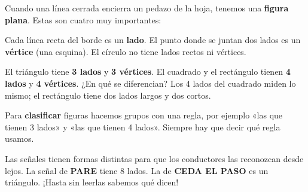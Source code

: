\documentclass[11pt]{article}
\begin{document}
Cuando una línea cerrada encierra un pedazo de la hoja, tenemos una
\textbf{figura plana}. Estas son cuatro muy importantes:

\begin{center}
\end{center}

Cada línea recta del borde es un \textbf{lado}. El punto donde se juntan dos
lados es un \textbf{vértice} (una esquina). El círculo no tiene lados rectos
ni vértices.

\begin{center}
\end{center}

\begin{ejemplo}
El triángulo tiene \textbf{3 lados} y \textbf{3 vértices}. El cuadrado y el
rectángulo tienen \textbf{4 lados} y \textbf{4 vértices}. ¿En qué se
diferencian? Los 4 lados del cuadrado miden lo mismo; el rectángulo tiene
dos lados largos y dos cortos.
\end{ejemplo}

Para \textbf{clasificar} figuras hacemos grupos con una regla, por ejemplo
«las que tienen 3 lados» y «las que tienen 4 lados». Siempre hay que decir
qué regla usamos.

\begin{aplicacion}
Las señales tienen formas distintas para que los conductores las reconozcan
desde lejos. La señal de \textbf{PARE} tiene 8 lados. La de \textbf{CEDA EL
PASO} es un triángulo. ¡Hasta sin leerlas sabemos qué dicen!
\end{aplicacion}
\end{document}
